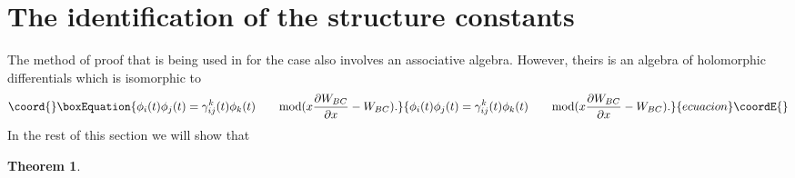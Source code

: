 \documentclass[a4paper,11pt]{article}
\newtheorem{theorem}{Theorem}
\numberwithin{equation}{section}
\begin{document}
\section{The identification of the structure constants}

The method of proof that is being used in \cite{MARS-MIRO-MORO:2000}
for the \coordHE{} case also involves an associative algebra. However,
theirs is an algebra of holomorphic differentials which is isomorphic to 
\begin{equation}\coord{}\boxEquation{
\phi _{i}(t)\phi _{j}(t)=\gamma _{ij}^{k}(t)\phi _{k}(t)\qquad \mbox{mod}(x
\dfrac{\partial W_{BC}}{\partial x}-W_{BC}).
}{
\phi _{i}(t)\phi _{j}(t)=\gamma _{ij}^{k}(t)\phi _{k}(t)\qquad \mbox{mod}(x
\dfrac{\partial W_{BC}}{\partial x}-W_{BC}).
}{ecuacion}\coordE{}\end{equation}
In the rest of this section we will show that

\begin{theorem}
\myHighlight{$\qquad \qquad \qquad \qquad \qquad $}\coordHE{}
\end{theorem}
\end{document}
